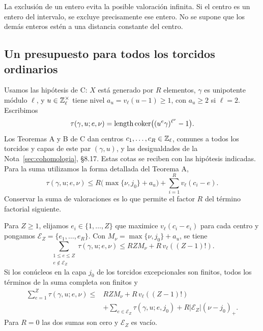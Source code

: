 La exclusión de un entero evita la posible valoración infinita.
Si el centro es un entero del intervalo, se excluye precisamente
ese entero. No se supone que los demás enteros estén a una
distancia constante del centro.

\subsection{Un presupuesto para todos los torcidos ordinarios}

Usamos las hipótesis de C: $X$ está generado por $R$ elementos,
$\gamma$ es unipotente módulo $\ell$, y $u\in\mathbb{Z}_\ell^\times$
tiene nivel $a_u=v_\ell(u-1)\ge1$, con $a_u\ge2$ si $\ell=2$.
Escribimos
\[
 \tau(\gamma,u;e,\nu)
 =\operatorname{length}\operatorname{coker}\bigl((u^e\gamma)^{\ell^\nu}-1\bigr).
\]
Los Teoremas A y B de C dan centros $c_1,\ldots,c_R\in\mathbb{Z}_\ell$,
comunes a todos los torcidos y capas de este par $(\gamma,u)$,
y las desigualdades de la Nota~\ref{sec:cohomologia}, §8.17.
Estas cotas se reciben con las hipótesis indicadas.
Para la suma utilizamos la forma detallada del Teorema A,
\[
 \tau(\gamma,u;e,\nu)
 \le R\bigl(\max\{\nu,j_0\}+a_u\bigr)
       +\sum_{i=1}^{R}v_\ell(c_i-e).
\]
Conservar la suma de valoraciones es lo que permite el factor
$R$ del término factorial siguiente.

\begin{proposicion}
\label{prop:fu-suma-torre}
Para $Z\ge1$, elijamos $e_i\in\{1,\ldots,Z\}$ que maximice
$v_\ell(c_i-e_i)$ para cada centro y pongamos
$\mathcal E_Z=\{e_1,\ldots,e_R\}$.
Con $M_\nu=\max\{\nu,j_0\}+a_u$, se tiene
\begin{equation}
 \sum_{\substack{1\le e\le Z\\e\notin\mathcal E_Z}}
      \tau(\gamma,u;e,\nu)
 \le RZ M_\nu+R\,v_\ell((Z-1)!).
 \label{eq:fu-suma-ordinaria}
\end{equation}
Si los conúcleos en la capa $j_0$ de los torcidos excepcionales
son finitos, todos los términos de la suma completa son finitos y
\begin{equation}
 \begin{split}
 \sum_{e=1}^{Z}\tau(\gamma,u;e,\nu)
 \le{}&RZ M_\nu+R\,v_\ell((Z-1)!)\\
 &+\sum_{e\in\mathcal E_Z}\tau(\gamma,u;e,j_0)
   +R|\mathcal E_Z|(\nu-j_0)_+.
 \end{split}
 \label{eq:fu-suma-completa}
\end{equation}
Para $R=0$ las dos sumas son cero y $\mathcal E_Z$ es vacío.
\end{proposicion}

